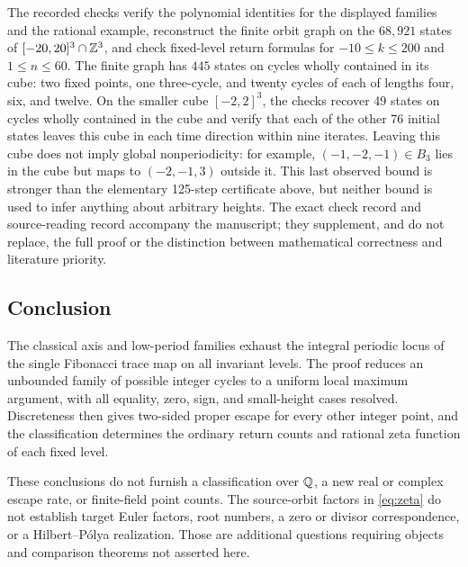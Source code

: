 The recorded checks verify the polynomial identities for the displayed
families and the rational example, reconstruct the finite orbit graph
on the $68{,}921$ states of $[-20,20]^3\cap\mathbb Z^3$, and check
fixed-level return formulas for $-10\leq k\leq200$ and
$1\leq n\leq60$. The finite graph has $445$ states on cycles
wholly contained in its cube:
two fixed points, one three-cycle, and twenty cycles of each of
lengths four, six, and twelve. On the smaller cube $[-2,2]^3$,
the checks recover 49 states on cycles wholly contained in the cube
and verify that each of the other 76 initial states leaves this cube
in each time direction within nine iterates. Leaving this cube does
not imply global nonperiodicity: for example, $(-1,-2,-1)\in B_3$
lies in the cube but maps to $(-2,-1,3)$ outside it. This
last observed bound is stronger than the elementary 125-step
certificate above, but neither bound is used to infer anything
about arbitrary heights. The exact check record and source-reading
record accompany the manuscript; they supplement, and do not replace,
the full proof or the distinction between mathematical correctness
and literature priority.

\subsection{Conclusion}

The classical axis and low-period families exhaust the integral
periodic locus of the single Fibonacci trace map on all invariant
levels. The proof reduces an unbounded family of possible integer
cycles to a uniform local maximum argument, with all equality, zero,
sign, and small-height cases resolved. Discreteness then gives
two-sided proper escape for every other integer point, and the
classification determines the ordinary return counts and rational
zeta function of each fixed level.

These conclusions do not furnish a classification over $\mathbb Q$, a new
real or complex escape rate, or finite-field point counts. The
source-orbit factors in \eqref{eq:zeta} do not establish target
Euler factors, root numbers, a zero or divisor correspondence, or a
Hilbert--P\'olya realization. Those are additional questions requiring
objects and comparison theorems not asserted here.
